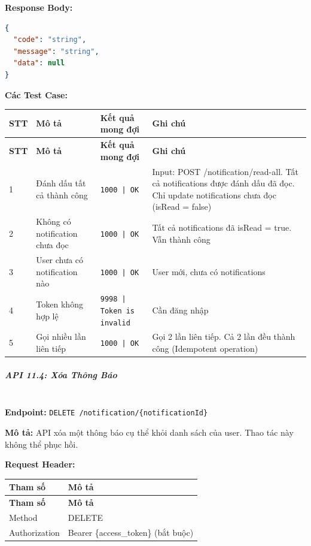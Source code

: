 \textbf{Response Body:}

\begin{lstlisting}[language=json]
{
  "code": "string",
  "message": "string",
  "data": null
}
\end{lstlisting}

\textbf{Các Test Case:}

\begin{longtable}{|p{}|p{}|p{}|p{}|}
\hline
\textbf{STT} & \textbf{Mô tả} & \textbf{Kết quả mong đợi} & \textbf{Ghi chú} \\
\hline
\endfirsthead

\hline
\textbf{STT} & \textbf{Mô tả} & \textbf{Kết quả mong đợi} & \textbf{Ghi chú} \\
\hline
\endhead

\hline
\endfoot

1 & Đánh dấu tất cả thành công & \texttt{1000 | OK} & Input: POST /notification/read-all. Tất cả notifications được đánh dấu đã đọc. Chỉ update notifications chưa đọc (isRead = false) \\
\hline
2 & Không có notification chưa đọc & \texttt{1000 | OK} & Tất cả notifications đã isRead = true. Vẫn thành công \\
\hline
3 & User chưa có notification nào & \texttt{1000 | OK} & User mới, chưa có notifications \\
\hline
4 & Token không hợp lệ & \texttt{9998 | Token is invalid} & Cần đăng nhập \\
\hline
5 & Gọi nhiều lần liên tiếp & \texttt{1000 | OK} & Gọi 2 lần liên tiếp. Cả 2 lần đều thành công (Idempotent operation) \\
\hline
\end{longtable}

\subparagraph{API 11.4: Xóa Thông Báo}~\\

\textbf{Endpoint:} \texttt{DELETE /notification/\{notificationId\}}

\textbf{Mô tả:} API xóa một thông báo cụ thể khỏi danh sách của user. Thao tác này không thể phục hồi.

\textbf{Request Header:}

\begin{longtable}{|p{}|p{}|}
\hline
\textbf{Tham số} & \textbf{Mô tả} \\
\hline
\endfirsthead

\hline
\textbf{Tham số} & \textbf{Mô tả} \\
\hline
\endhead

\hline
\endfoot

Method & DELETE \\
\hline
Authorization & Bearer \{access\_token\} (bắt buộc) \\
\hline
\end{longtable}

